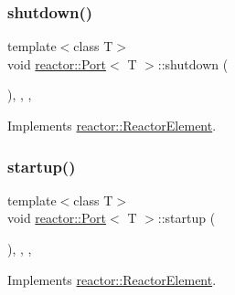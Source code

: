 \mbox{\label{classreactor_1_1Port_a3d440102c643fd98d17b4cf8714c910d}} 
\subsubsection{\texorpdfstring{shutdown()}{shutdown()}}
{\footnotesize\ttfamily template$<$class T$>$ \\
void \hyperlink{classreactor_1_1Port}{reactor\+::\+Port}$<$ T $>$\+::shutdown (\begin{DoxyParamCaption}{ }\end{DoxyParamCaption})\hspace{0.3cm}{\ttfamily [inline]}, {\ttfamily [final]}, {\ttfamily [override]}, {\ttfamily [virtual]}}



Implements \hyperlink{classreactor_1_1ReactorElement_a8fce084bef582156979ebba56737e907}{reactor\+::\+Reactor\+Element}.

\mbox{\label{classreactor_1_1Port_ae182b2b10c53f2a21c424437dfc2b40e}} 
\subsubsection{\texorpdfstring{startup()}{startup()}}
{\footnotesize\ttfamily template$<$class T$>$ \\
void \hyperlink{classreactor_1_1Port}{reactor\+::\+Port}$<$ T $>$\+::startup (\begin{DoxyParamCaption}{ }\end{DoxyParamCaption})\hspace{0.3cm}{\ttfamily [inline]}, {\ttfamily [final]}, {\ttfamily [override]}, {\ttfamily [virtual]}}



Implements \hyperlink{classreactor_1_1ReactorElement_a8cb574cb20ff963903ad905fb0a157e3}{reactor\+::\+Reactor\+Element}.

\mbox{\label{classreactor_1_1Port_a22d0ef9cd82989e03a669aeccf8e694a}} 
